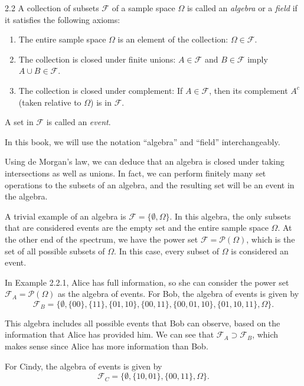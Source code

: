 \begin{defbox}{2.2}
A collection of subsets $\mathcal{F}$ of a sample space $\Omega$ is called an \textit{algebra} or a \textit{field} if it satisfies the following axioms:
\begin{enumerate}[label=\arabic*.]
    \item The entire sample space $\Omega$ is an element of the collection: $\Omega\in \mathcal{F}$.
    \item The collection is closed under finite unions: $A\in \mathcal{F}$ and $B\in \mathcal{F}$ imply $A\cup B\in \mathcal{F}$.
    \item The collection is closed under complement: If $A\in \mathcal{F}$, then its complement $A^c$ (taken relative to $\Omega$) is in $\mathcal{F}$.
\end{enumerate}

A set in $\mathcal{F}$ is called an \textit{event}.
\end{defbox}

In this book, we will use the notation ``algebra'' and ``field'' interchangeably.

Using de Morgan's law, we can deduce that an algebra is closed under taking intersections as well as unions. In fact, we can perform finitely many set operations to the subsets of an algebra, and the resulting set will be an event in the algebra.

A trivial example of an algebra is $\mathcal{F}=\{\emptyset,\Omega\}$. In this algebra, the only subsets that are considered events are the empty set and the entire sample space $\Omega$. At the other end of the spectrum, we have the power set $\mathcal{F}=\mathcal{P}(\Omega)$, which is the set of all possible subsets of $\Omega$. In this case, every subset of $\Omega$ is considered an event.

In Example 2.2.1, Alice has full information, so she can consider the power set $\mathcal{F}_A=\mathcal{P}(\Omega)$ as the algebra of events. For Bob, the algebra of events is given by
\[
\mathcal{F}_B=
\{\emptyset,\{00\},\{11\},\{01,10\},\{00,11\},\{00,01,10\},\{01,10,11\},\Omega\}.
\]

This algebra includes all possible events that Bob can observe, based on the information that Alice has provided him. We can see that $\mathcal{F}_A \supset \mathcal{F}_B$, which makes sense since Alice has more information than Bob.

For Cindy, the algebra of events is given by
\[
\mathcal{F}_C=\{\emptyset,\{10,01\},\{00,11\},\Omega\}.
\]

